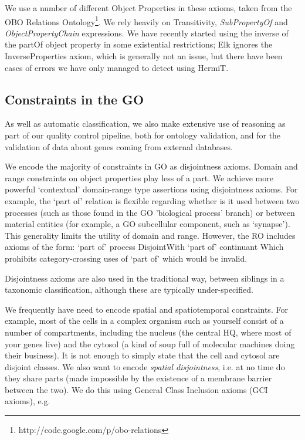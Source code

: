 \documentclass{llncs}
\begin{document}
We use a number of different Object Properties in these axioms, taken
from the OBO Relations
Ontology\footnote{http://code.google.com/p/obo-relations}. We rely
heavily on Transitivity, \emph{SubPropertyOf} and
\emph{ObjectPropertyChain} expressions. We have recently started using the
inverse of the partOf object property in some existential
restrictions\cite{berardini2010gene}; Elk ignores the
InverseProperties axiom, which is generally not an issue, but there
have been cases of errors we have only managed to detect using HermiT.

\subsection{Constraints in the GO}

As well as automatic classification, we also make extensive use of
reasoning as part of our quality control pipeline, both for ontology
validation, and for the validation of data about genes coming from
external databases.


We encode the majority of constraints in GO as disjointness axioms.
Domain and range constraints on object properties play less of a
part. We achieve more powerful ‘contextual’ domain-range type
assertions using disjointness axioms. For example, the `part of'
relation is flexible regarding whether is it used between two
processes (such as those found in the GO 'biological process' branch)
or between material entities (for example, a GO subcellular component,
such as ‘synapse’). This generality limits the utility of domain and
range. However, the RO includes axioms of the form: `part of' process
DisjointWith `part of' continuant Which prohibits category-crossing
uses of `part of' which would be invalid.

Disjointness axioms are also used in the traditional way, between
siblings in a taxonomic classification, although these are typically
under-specified.

We frequently have need to encode spatial and spatiotemporal
constraints. For example, most of the cells in a complex organism such
as yourself consist of a number of compartments, including the nucleus
(the central HQ, where most of your genes live) and the cytosol (a
kind of soup full of molecular machines doing their business). It is
not enough to simply state that the cell and cytosol are disjoint
classes. We also want to encode \emph{spatial disjointness}, i.e. at
no time do they share parts (made impossible by the existence of a
membrane barrier between the two). We do this using General Class
Inclusion axioms (GCI axioms), e.g.
\end{document}
